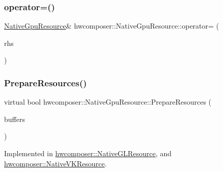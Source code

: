 \mbox{\label{classhwcomposer_1_1NativeGpuResource_a863b08b543c7a739a373fedf15cd2845}} 
\subsubsection{\texorpdfstring{operator=()}{operator=()}\hspace{0.1cm}{\footnotesize\ttfamily [2/2]}}
{\footnotesize\ttfamily \mbox{\hyperlink{classhwcomposer_1_1NativeGpuResource}{Native\+Gpu\+Resource}}\& hwcomposer\+::\+Native\+Gpu\+Resource\+::operator= (\begin{DoxyParamCaption}\item[{\mbox{\hyperlink{classhwcomposer_1_1NativeGpuResource}{Native\+Gpu\+Resource}} \&\&}]{rhs }\end{DoxyParamCaption})\hspace{0.3cm}{\ttfamily [delete]}}

\mbox{\label{classhwcomposer_1_1NativeGpuResource_a3f1da37f41ff245e1bfe9e44d69a3202}} 
\subsubsection{\texorpdfstring{Prepare\+Resources()}{PrepareResources()}}
{\footnotesize\ttfamily virtual bool hwcomposer\+::\+Native\+Gpu\+Resource\+::\+Prepare\+Resources (\begin{DoxyParamCaption}\item[{const std\+::vector$<$ \mbox{\hyperlink{classhwcomposer_1_1OverlayBuffer}{Overlay\+Buffer}} $\ast$$>$ \&}]{buffers }\end{DoxyParamCaption})\hspace{0.3cm}{\ttfamily [pure virtual]}}



Implemented in \mbox{\hyperlink{classhwcomposer_1_1NativeGLResource_a1d9a2081a910c8fbac2e15ac17f89087}{hwcomposer\+::\+Native\+G\+L\+Resource}}, and \mbox{\hyperlink{classhwcomposer_1_1NativeVKResource_a0ec0dd54f25a32da5645d8e40e1ecf4f}{hwcomposer\+::\+Native\+V\+K\+Resource}}.

